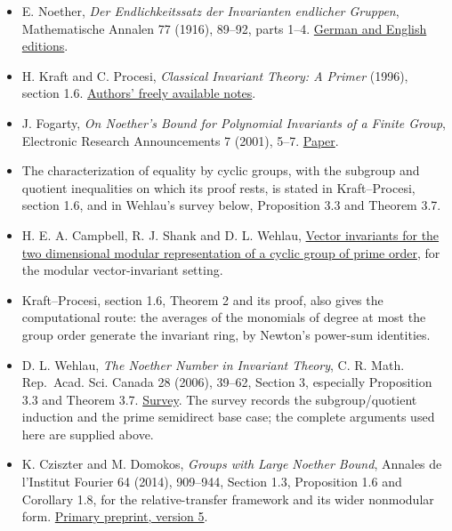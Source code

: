 \documentclass[
]{article}
\providecommand{\tightlist}{%
  \setlength{\itemsep}{0pt}\setlength{\parskip}{0pt}}
\begin{document}
\begin{itemize}
\tightlist
\item
  E. Noether, \emph{Der Endlichkeitssatz der Invarianten endlicher
  Gruppen}, Mathematische Annalen 77 (1916), 89--92, parts 1--4.
  \href{https://github.com/KokunoYumeto/emmy-noether-en}{German and
  English editions}.
\item
  H. Kraft and C. Procesi, \emph{Classical Invariant Theory: A Primer}
  (1996), section 1.6.
  \href{https://dmi.unibas.ch/fileadmin/user_upload/dmi/Personen/Kraft_Hanspeter/Classical_Invariant_Theory.pdf}{Authors'
  freely available notes}.
\item
  J. Fogarty, \emph{On Noether's Bound for Polynomial Invariants of a
  Finite Group}, Electronic Research Announcements 7 (2001), 5--7.
  \href{https://www.aimsciences.org/article/id/9d13e48f-6b04-4ef9-bb7d-0aa0027725c6}{Paper}.
\item
  The characterization of equality by cyclic groups, with the subgroup
  and quotient inequalities on which its proof rests, is stated in
  Kraft--Procesi, section 1.6, and in Wehlau's survey below, Proposition
  3.3 and Theorem 3.7.
\item
  H. E. A. Campbell, R. J. Shank and D. L. Wehlau,
  \href{https://arxiv.org/abs/0901.2811v2}{Vector invariants for the two
  dimensional modular representation of a cyclic group of prime order},
  for the modular vector-invariant setting.
\item
  Kraft--Procesi, section 1.6, Theorem 2 and its proof, also gives the
  computational route: the averages of the monomials of degree at most
  the group order generate the invariant ring, by Newton's power-sum
  identities.
\item
  D. L. Wehlau, \emph{The Noether Number in Invariant Theory}, C. R.
  Math. Rep.~Acad. Sci. Canada 28 (2006), 39--62, Section 3, especially
  Proposition 3.3 and Theorem 3.7.
  \href{https://mathreports.ca/download/522/}{Survey}. The survey
  records the subgroup/quotient induction and the prime semidirect base
  case; the complete arguments used here are supplied above.
\item
  K. Cziszter and M. Domokos, \emph{Groups with Large Noether Bound},
  Annales de l'Institut Fourier 64 (2014), 909--944, Section 1.3,
  Proposition 1.6 and Corollary 1.8, for the relative-transfer framework
  and its wider nonmodular form.
  \href{https://arxiv.org/abs/1105.0679}{Primary preprint, version 5}.
\end{itemize}
\end{document}
